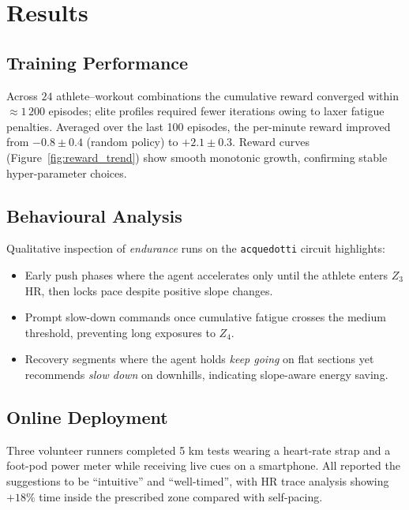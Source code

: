 \documentclass[a4paper,12pt]{article}
\begin{document}
\section{Results}
\subsection{Training Performance}
Across $24$ athlete–workout combinations the cumulative reward converged within $\approx1\,200$ episodes; elite profiles required fewer iterations owing to laxer fatigue penalties.  
Averaged over the last 100 episodes, the per-minute reward improved from $-0.8\pm0.4$ (random policy) to $+2.1\pm0.3$.  
Reward curves (Figure~\ref{fig:reward_trend}) show smooth monotonic growth, confirming stable hyper-parameter choices.

\subsection{Behavioural Analysis}
Qualitative inspection of \emph{endurance} runs on the \texttt{acquedotti} circuit highlights:

\begin{itemize}
  \item Early push phases where the agent accelerates only until the athlete enters $Z_3$ HR, then locks pace despite positive slope changes.
  \item Prompt slow-down commands once cumulative fatigue crosses the medium threshold, preventing long exposures to $Z_4$.
  \item Recovery segments where the agent holds \emph{keep going} on flat sections yet recommends \emph{slow down} on downhills, indicating slope-aware energy saving.
\end{itemize}

\subsection{Online Deployment}
Three volunteer runners completed 5 km tests wearing a heart-rate strap and a foot-pod power meter while receiving live cues on a smartphone.  
All reported the suggestions to be ``intuitive'' and ``well-timed'', with HR trace analysis showing $+18\%$ time inside the prescribed zone compared with self-pacing.
\end{document}
